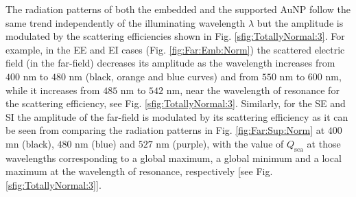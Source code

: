 The radiation patterns of both the embedded  and the supported AuNP follow the same trend independently of the illuminating wavelength $\lambda$ but the amplitude is modulated by the scattering efficiencies shown in Fig. \ref{sfig:TotallyNormal:3}. For example, in the EE  and EI cases (Fig. \ref{fig:Far:Emb:Norm}) the scattered electric field (in the far-field) decreases its amplitude as the wavelength increases from $400$ nm to $480$ nm (black, orange and blue curves) and from   $550$ nm to $600$  nm, while it increases from $485$ nm to $542$ nm, near the wavelength of resonance for the scattering efficiency, see Fig. \ref{sfig:TotallyNormal:3}. Similarly, for the SE and SI  the amplitude of the far-field is modulated by its scattering efficiency as it can be seen from comparing the radiation patterns in Fig. \ref{fig:Far:Sup:Norm} at $400$ mn (black), $480$ nm (blue) and  $527$ nm (purple), with the value of $Q_\text{sca}$ at those wavelengths  corresponding to a global maximum, a global minimum and a local maximum at the wavelength of resonance, respectively [see Fig. \ref{sfig:TotallyNormal:3}].

